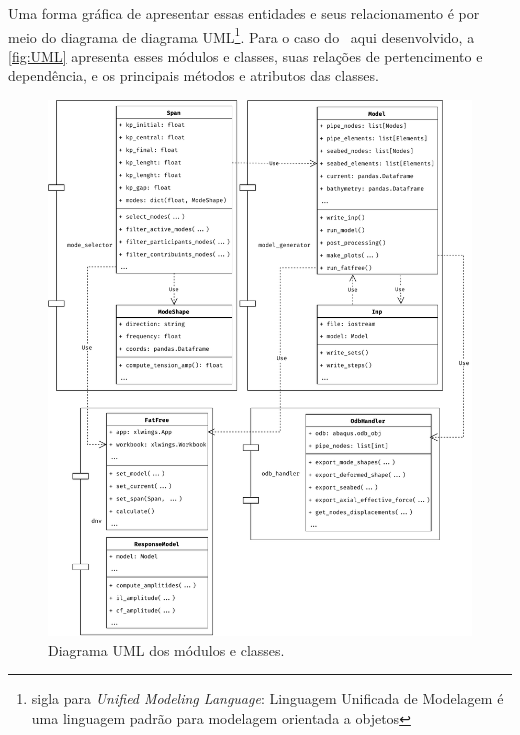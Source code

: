 Uma forma gráfica de apresentar essas entidades e seus relacionamento é por meio do diagrama de diagrama UML\footnote{sigla para \textit{Unified Modeling Language}: Linguagem Unificada de Modelagem é uma linguagem padrão para modelagem orientada a objetos}\cite{infoescolauml}. Para o caso do \frame\ aqui desenvolvido, a \autoref{fig:UML} apresenta esses módulos e classes, suas relações de pertencimento e dependência, e os principais métodos e atributos das classes.

\begin{figure}[!ht]
    \centering
    \caption{Diagrama UML dos módulos e classes.}\label{fig:UML}
    \includegraphics[width=\textwidth]{imagens/UML}
\end{figure}
